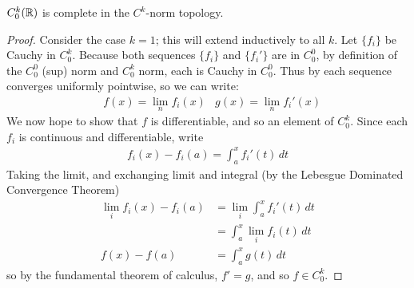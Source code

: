       \begin{thm}
        \label{thm:ck0complete}
        $C^k_0(\mathbb{R})$ is complete in the $C^k$-norm topology.
      \end{thm}
      \begin{proof}
        Consider the case $k=1$; this will extend inductively to all $k$.
        Let $\{f_i\}$ be Cauchy in $C^k_0$.
        Because both sequences $\{f_i\}$ and $\{f_i'\}$ are in $C^0_0$, by definition of the $C^0_0$ (sup) norm and $C^k_0$ norm, each is Cauchy in $C^0_0$.
        Thus by  each sequence converges uniformly pointwise, so we can write:
        \begin{align*}
          &f(x)=\lim_n f_i(x) &g(x)=\lim_n f_i'(x)
        \end{align*}
        We now hope to show that $f$ is differentiable, and so an element of $C^k_0$.
        Since each $f_i$ is continuous and differentiable, write
        \begin{align*}
          f_i(x)-f_i(a) = \int_a^x f_i'(t)\,dt
        \end{align*}
        Taking the limit, and exchanging limit and integral (by the Lebesgue Dominated Convergence Theorem)
        \begin{align*}
          \lim_i f_i(x)-f_i(a) &= \lim_i\int_a^x f_i'(t)\,dt\\
          &= \int_a^x\lim_if_i(t)\,dt\\
          f(x)-f(a) &= \int_a^x g(t)\,dt
        \end{align*}
        so by the fundamental theorem of calculus, $f'=g$, and so $f\in C^k_0$.
      \end{proof}

